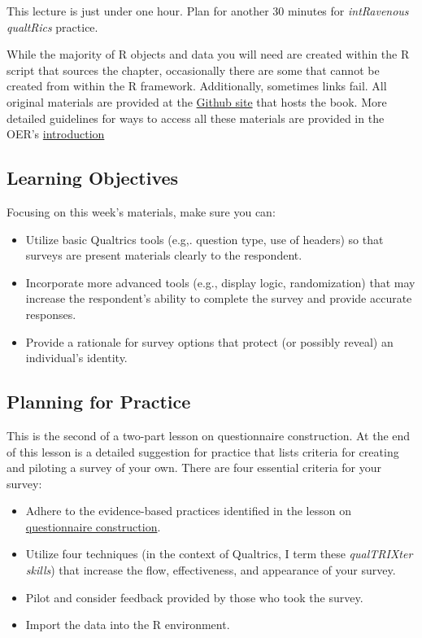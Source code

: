 \documentclass[
  english,
]{book}
\providecommand{\tightlist}{%
  \setlength{\itemsep}{0pt}\setlength{\parskip}{0pt}}
\begin{document}
This lecture is just under one hour. Plan for another 30 minutes for \emph{intRavenous qualtRics} practice.

While the majority of R objects and data you will need are created within the R script that sources the chapter, occasionally there are some that cannot be created from within the R framework. Additionally, sometimes links fail. All original materials are provided at the \href{https://github.com/lhbikos/ReC_Psychometrics}{Github site} that hosts the book. More detailed guidelines for ways to access all these materials are provided in the OER's \protect\hyperlink{ReCintro}{introduction}

\hypertarget{learning-objectives-1}{%
\subsection{Learning Objectives}\label{learning-objectives-1}}

Focusing on this week's materials, make sure you can:

\begin{itemize}
\tightlist
\item
  Utilize basic Qualtrics tools (e.g,. question type, use of headers) so that surveys are present materials clearly to the respondent.
\item
  Incorporate more advanced tools (e.g., display logic, randomization) that may increase the respondent's ability to complete the survey and provide accurate responses.
\item
  Provide a rationale for survey options that protect (or possibly reveal) an individual's identity.
\end{itemize}

\hypertarget{planning-for-practice-1}{%
\subsection{Planning for Practice}\label{planning-for-practice-1}}

This is the second of a two-part lesson on questionnaire construction. At the end of this lesson is a detailed suggestion for practice that lists criteria for creating and piloting a survey of your own. There are four essential criteria for your survey:

\begin{itemize}
\tightlist
\item
  Adhere to the evidence-based practices identified in the lesson on \protect\hyperlink{QuestCon}{questionnaire construction}.
\item
  Utilize four techniques (in the context of Qualtrics, I term these \emph{qualTRIXter skills}) that increase the flow, effectiveness, and appearance of your survey.
\item
  Pilot and consider feedback provided by those who took the survey.
\item
  Import the data into the R environment.
\end{itemize}
\end{document}
